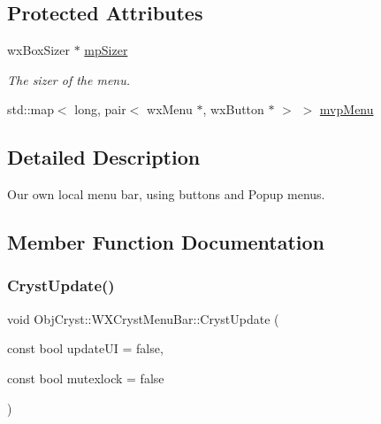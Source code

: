 \subsection*{Protected Attributes}
\begin{DoxyCompactItemize}
\item 
\mbox{\label{class_obj_cryst_1_1_w_x_cryst_menu_bar_a082b747b0a157df1dbe86349450f3f7a}} 
wx\+Box\+Sizer $\ast$ \mbox{\hyperlink{class_obj_cryst_1_1_w_x_cryst_menu_bar_a082b747b0a157df1dbe86349450f3f7a}{mp\+Sizer}}
\begin{DoxyCompactList}\small\item\em The sizer of the menu. \end{DoxyCompactList}\item 
std\+::map$<$ long, pair$<$ wx\+Menu $\ast$, wx\+Button $\ast$ $>$ $>$ \mbox{\hyperlink{class_obj_cryst_1_1_w_x_cryst_menu_bar_a73b92cea8b7a55c69d3c552771505560}{mvp\+Menu}}
\end{DoxyCompactItemize}


\subsection{Detailed Description}
Our own local menu bar, using buttons and Popup menus. 

\subsection{Member Function Documentation}
\mbox{\label{class_obj_cryst_1_1_w_x_cryst_menu_bar_a9cdd403a3463200227c2cdda64ad0317}} 
\subsubsection{\texorpdfstring{CrystUpdate()}{CrystUpdate()}}
{\footnotesize\ttfamily void Obj\+Cryst\+::\+W\+X\+Cryst\+Menu\+Bar\+::\+Cryst\+Update (\begin{DoxyParamCaption}\item[{const bool}]{update\+UI = {\ttfamily false},  }\item[{const bool}]{mutexlock = {\ttfamily false} }\end{DoxyParamCaption})\hspace{0.3cm}{\ttfamily [virtual]}}

